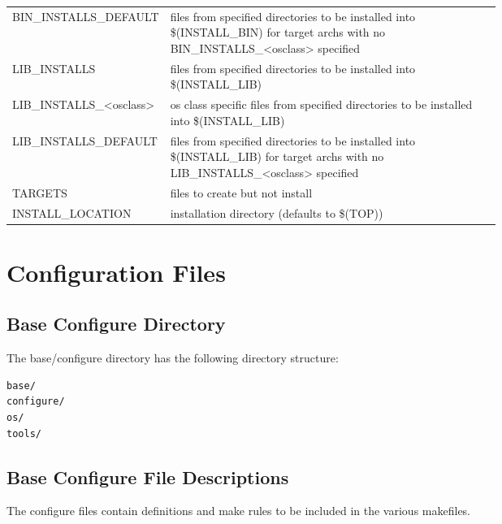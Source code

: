 \begin{center}
\begin{longtable}{lp{0.7\linewidth}}
BIN\_INSTALLS\_DEFAULT & files from specified directories to be installed into \$(INSTALL\_BIN) for target archs with no BIN\_INSTALLS\_\textless{}osclass\textgreater{} specified\\
LIB\_INSTALLS & files from specified directories to be installed into \$(INSTALL\_LIB)\\
LIB\_INSTALLS\_\textless{}osclass\textgreater{} & os class specific files from specified directories to be installed into \$(INSTALL\_LIB)\\
LIB\_INSTALLS\_DEFAULT & files from specified directories to be installed into \$(INSTALL\_LIB) for target archs with no LIB\_INSTALLS\_\textless{}osclass\textgreater{} specified\\
TARGETS & files to create but not install\\
INSTALL\_LOCATION & installation directory (defaults to \$(TOP))
\end{longtable}\end{center}


\section{Configuration Files}

\subsection{Base Configure Directory}

The base/configure directory has the following directory structure:

\begin{verbatim}base/
configure/
os/
tools/

\end{verbatim}\subsection{Base Configure File Descriptions}

The configure files contain definitions and make rules to be included in the various makefiles.

